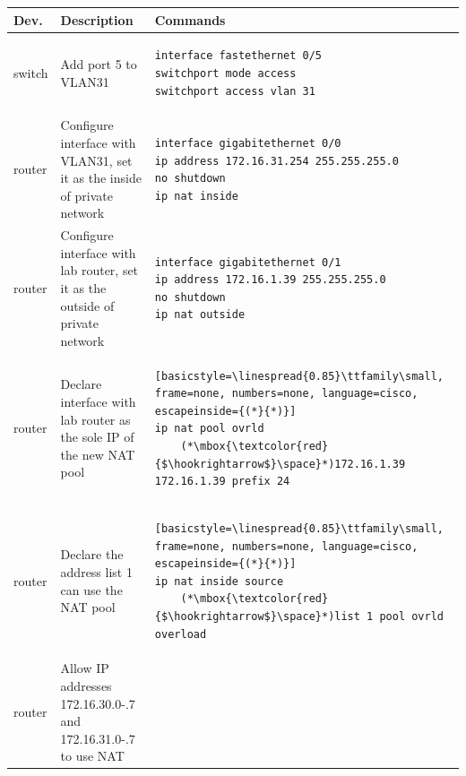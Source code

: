 \documentclass[a4paper, 11pt]{report}
\begin{document}
\begin{center}
    \small
    \begin{longtable}{@{}l | m{77mm} | l@{}}
        {\normalfont\textbf{Dev.}} & {\normalfont\textbf{Description}} & {\normalfont\textbf{Commands}} \\ \hline
        switch & Add port 5 to VLAN31 & \begin{lstlisting}[basicstyle=\linespread{0.85}\ttfamily\small, frame=none, numbers=none, language=cisco]
interface fastethernet 0/5
switchport mode access
switchport access vlan 31
        \end{lstlisting} \\ \hline
        router & Configure interface with VLAN31, set it as the inside of private network & \begin{lstlisting}[basicstyle=\linespread{0.85}\ttfamily\small, frame=none, numbers=none, language=cisco]
interface gigabitethernet 0/0
ip address 172.16.31.254 255.255.255.0
no shutdown
ip nat inside
        \end{lstlisting} \\
        router & Configure interface with lab router, set it as the outside of private network & \begin{lstlisting}[basicstyle=\linespread{0.85}\ttfamily\small, frame=none, numbers=none, language=cisco]
interface gigabitethernet 0/1
ip address 172.16.1.39 255.255.255.0
no shutdown
ip nat outside
        \end{lstlisting} \\
        router & Declare interface with lab router as the sole IP of the new NAT pool & \begin{lstlisting}[basicstyle=\linespread{0.85}\ttfamily\small, frame=none, numbers=none, language=cisco, escapeinside={(*}{*)}]
ip nat pool ovrld
    (*\mbox{\textcolor{red}{$\hookrightarrow$}\space}*)172.16.1.39 172.16.1.39 prefix 24
        \end{lstlisting} \\
        router & Declare the address list 1 can use the NAT pool & \begin{lstlisting}[basicstyle=\linespread{0.85}\ttfamily\small, frame=none, numbers=none, language=cisco, escapeinside={(*}{*)}]
ip nat inside source
    (*\mbox{\textcolor{red}{$\hookrightarrow$}\space}*)list 1 pool ovrld overload
        \end{lstlisting}\\
        router & Allow IP addresses 172.16.30.0-.7 and 172.16.31.0-.7 to use NAT & \begin{lstlisting}[basicstyle=\linespread{0.85}\ttfamily\small, frame=none, numbers=none, language=cisco]

\end{lstlisting}
\end{longtable}
\end{center}
\end{document}

